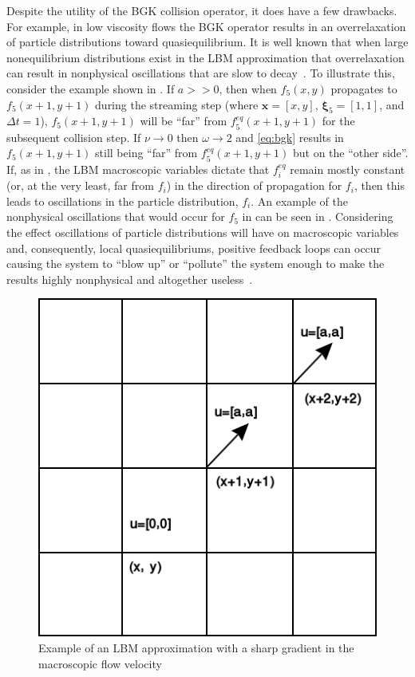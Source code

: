 \documentclass[pdftex,ms]{pittetd}
\newcommand{\pos}{\mathbf{x}}
\newcommand{\pvel}{\boldsymbol{\xi}}
\begin{document}
Despite the utility of the BGK collision operator, it does have a few drawbacks.
For example, in low viscosity flows the BGK operator results in an overrelaxation of particle distributions toward quasiequilibrium.
It is well known that when large nonequilibrium distributions exist in the LBM approximation that overrelaxation can result in nonphysical oscillations that are slow to decay~\cite{brownlee2007stability,dellar2003incompressible}.
To illustrate this, consider the example shown in .
If $a >> 0$, then when $f_5(x,y)$ propagates to $f_5(x+1,y+1)$ during the streaming step (where $\pos = [x,y]$, $\pvel_5 = [1,1]$, and $\Delta t = 1$), $f_5(x+1,y+1)$ will be ``far'' from $f^{eq}_5(x+1,y+1)$ for the subsequent collision step.
If $\nu \rightarrow 0$ then $\omega \rightarrow 2$ and \eqref{eq:bgk} results in $f_5(x+1,y+1)$ still being ``far'' from $f^{eq}_5(x+1,y+1)$ but on the ``other side''.
If, as in , the LBM macroscopic variables dictate that $f^{eq}_i$ remain mostly constant (or, at the very least, far from $f_i$) in the direction of propagation for $f_i$, then this leads to oscillations in the particle distribution, $f_i$.
An example of the nonphysical oscillations that would occur for $f_5$ in  can be seen in .
Considering the effect oscillations of particle distributions will have on macroscopic variables and, consequently, local quasiequilibriums, positive feedback loops can occur causing the system to ``blow up'' or ``pollute'' the system enough to make the results highly nonphysical and altogether useless~\cite{gorban2014enhancement}.

\begin{figure}
	\centering
    \includegraphics[width=\linewidth]{figs/sharp_gradient}
    \caption{Example of an LBM approximation with a sharp gradient in the macroscopic flow velocity}
    \label{fig:sharp-grad}
\end{figure}
\end{document}
